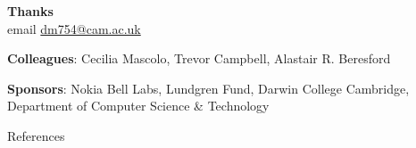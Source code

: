 \documentclass[hyperref={colorlinks = true},unknownkeysallowed]{beamer}
\begin{document}



\begin{frame}
	\Large{\textbf{Thanks} \\ email \href{mailto:dm754@cam.ac.uk}{dm754@cam.ac.uk}  }
	\item \textbf{Colleagues}: Cecilia Mascolo, Trevor Campbell, Alastair R. Beresford
	\item \textbf{Sponsors}: Nokia Bell Labs, Lundgren Fund, Darwin College Cambridge, Department of Computer Science \& Technology
\end{frame}

\begin{frame}[allowframebreaks]{References}
	\tiny %
	
\end{frame}
\end{document}
